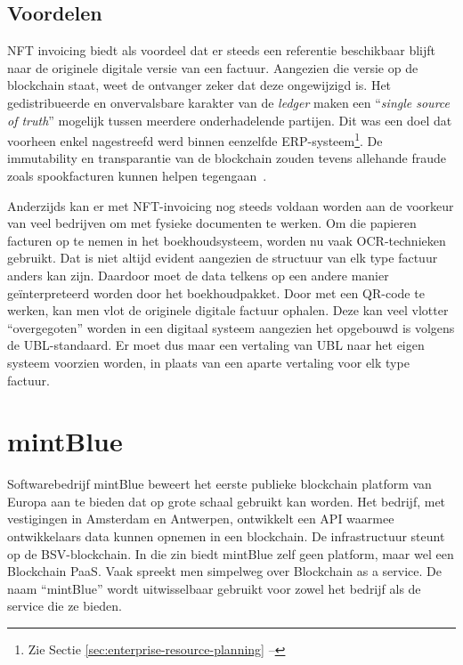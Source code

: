 \subsection{Voordelen}
\label{sub:voordelen}

NFT invoicing biedt als voordeel dat er steeds een referentie beschikbaar blijft naar de originele digitale versie van een factuur. Aangezien die versie op de blockchain staat, weet de ontvanger zeker dat deze ongewijzigd is. Het gedistribueerde en onvervalsbare karakter van de \textit{ledger} maken een ``\textit{single source of truth}'' mogelijk tussen meerdere onderhadelende partijen. Dit was een doel dat voorheen enkel nagestreefd werd binnen eenzelfde ERP-systeem\footnote{Zie Sectie \ref{sec:enterprise-resource-planning} -- }. De immutability en transparantie van de blockchain zouden tevens allehande fraude zoals spookfacturen kunnen helpen tegengaan~\autocite{Sterk2021}. 

Anderzijds kan er met NFT-invoicing nog steeds voldaan worden aan de voorkeur van veel bedrijven om met fysieke documenten te werken. Om die papieren facturen op te nemen in het boekhoudsysteem, worden nu vaak OCR-technieken gebruikt. Dat is niet altijd evident aangezien de structuur van elk type factuur anders kan zijn. Daardoor moet de data telkens op een andere manier geïnterpreteerd worden door het boekhoudpakket. Door met een QR-code te werken, kan men vlot de originele digitale factuur ophalen. Deze kan veel vlotter ``overgegoten'' worden in een digitaal systeem aangezien het opgebouwd is volgens de UBL-standaard. Er moet dus maar een vertaling van UBL naar het eigen systeem voorzien worden, in plaats van een aparte vertaling voor elk type factuur.

\section{mintBlue}
\label{sec:mintBlue}

Softwarebedrijf mintBlue beweert het eerste publieke blockchain platform van Europa aan te bieden dat op grote schaal gebruikt kan worden. Het bedrijf, met vestigingen in Amsterdam en Antwerpen, ontwikkelt een API waarmee ontwikkelaars data kunnen opnemen in een blockchain. De infrastructuur steunt op de BSV-blockchain. In die zin biedt mintBlue zelf geen platform, maar wel een Blockchain PaaS. Vaak spreekt men simpelweg over Blockchain as a service. De naam ``mintBlue'' wordt uitwisselbaar gebruikt voor zowel het bedrijf als de service die ze bieden.

